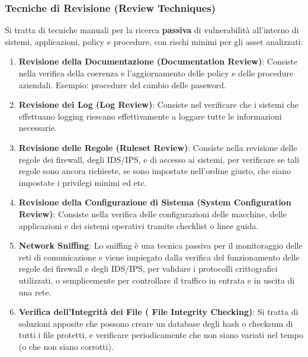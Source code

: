 \documentclass{article}
\begin{document}
\subsubsection{Tecniche di Revisione (Review Techniques)}
Si tratta di tecniche manuali per la ricerca \textbf{passiva} di vulnerabilità all’interno di sistemi, applicazioni, policy e procedure, con rischi minimi per gli asset analizzati:

\begin{enumerate}
    \item \textbf{Revisione della Documentazione (Documentation Review)}: Consiste nella verifica della coerenza e l'aggiornamento delle policy e delle procedure aziendali.
        Esempio: procedure del cambio delle password.

    \item \textbf{Revisione dei Log (Log Review)}: Consiste nel verificare che i sistemi che effettuano logging riescano effettivamente a loggare tutte le informazioni necessarie.

    \item \textbf{Revisione delle Regole (Ruleset Review)}: Consiste nella revisione delle regole dei firewall, degli IDS/IPS, e di accesso ai sistemi, per verificare se tali regole sono ancora richieste, se sono impostate nell’ordine giusto, che siano impostate i privilegi minimi ed etc.

    \item \textbf{Revisione della Configurazione di Sistema (System Configuration Review)}: Consiste nella verifica delle configurazioni delle macchine, delle applicazioni e dei sistemi operativi tramite checklist o linee guida.

    \item \textbf{Network Sniffing}: Lo sniffing è una tecnica passiva per il monitoraggio delle reti di comunicazione e viene impiegato dalla verifica del funzionamento delle regole dei firewall e degli IDS/IPS, per validare i protocolli crittografici utilizzati, o semplicemente per controllare il traffico in entrata e in uscita di una rete.

    \item \textbf{Verifica dell’Integrità dei File ( File Integrity Checking)}: Si tratta di soluzioni apposite che possono creare un database degli hash o checksum di tutti i file protetti, e verificare periodicamente che non siano variati nel tempo (o che non siano corrotti).
            
\end{enumerate}
\newpage
\end{document}
